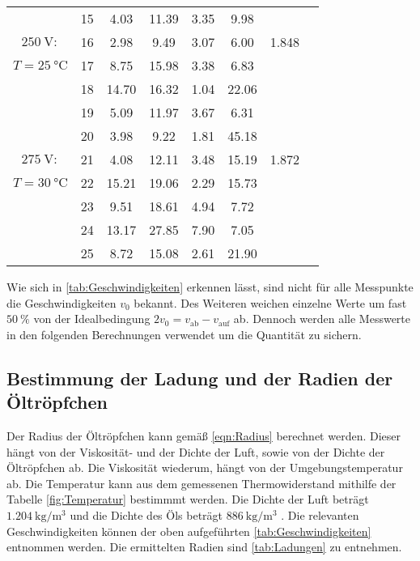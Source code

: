 \begin{table}[H]
\begin{tabular}{c l S[table-format = 2.2] S S S[table-format = 1.2] S[table-format = 2.2] S[table-format = 1.3]}
        {                   } &          {15} &  4.03 & 11.39 & 3.35 &  9.98 & \\
        {$\qty{250}{\volt}:$} &          {16} &  2.98 &  9.49 & 3.07 &  6.00 & 1.848 \\
        $T = \qty{25}{\celsius}$ &       {17} &  8.75 & 15.98 & 3.38 &  6.83 & \\
        {                   } &          {18} & 14.70 & 16.32 & 1.04 & 22.06 & \\
        {                   } &          {19} &  5.09 & 11.97 & 3.67 &  6.31 & \\
        {                   } &          {20} &  3.98 &  9.22 & 1.81 & 45.18 & \\
        {$\qty{275}{\volt}:$} &          {21} &  4.08 & 12.11 & 3.48 & 15.19 & 1.872 \\
        {$T = \qty{30}{\celsius}$} &     {22} & 15.21 & 19.06 & 2.29 & 15.73 & \\
        {                   } &          {23} &  9.51 & 18.61 & 4.94 &  7.72 & \\
        {                   } &          {24} & 13.17 & 27.85 & 7.90 &  7.05 & \\
        {                   } &          {25} &  8.72 & 15.08 & 2.61 & 21.90 & \\
      \bottomrule
    \end{tabular}
  \end{table}

Wie sich in \autoref{tab:Geschwindigkeiten} erkennen lässt, sind nicht für alle Messpunkte die Geschwindigkeiten $v_0$ bekannt. Des Weiteren weichen einzelne Werte um fast 
$\qty{50}{\percent}$ von der Idealbedingung $2v_0 = v_\text{ab} - v_\text{auf}$ ab. Dennoch werden alle Messwerte in den folgenden Berechnungen verwendet um die Quantität
zu sichern. 

\subsection{Bestimmung der Ladung und der Radien der Öltröpfchen}
\label{subsec:ladungradius}
Der Radius der Öltröpfchen kann gemäß \autoref{eqn:Radius} berechnet werden. Dieser hängt von der Viskosität-
und der Dichte der Luft, sowie von der Dichte der Öltröpfchen ab. Die Viskosität wiederum, hängt von der Umgebungstemperatur ab. Die Temperatur kann aus dem gemessenen 
Thermowiderstand mithilfe der Tabelle \ref{fig:Temperatur} bestimmmt werden. Die Dichte der Luft beträgt $\qty{1.204}{\kilo\gram\per\cubic\metre}$
und die Dichte des Öls beträgt $\qty{886}{\kilo\gram\per\cubic\metre}$ \cite{v503}. Die relevanten Geschwindigkeiten können der oben aufgeführten \autoref{tab:Geschwindigkeiten}
entnommen werden. Die ermittelten Radien sind \autoref{tab:Ladungen} zu entnehmen. 

